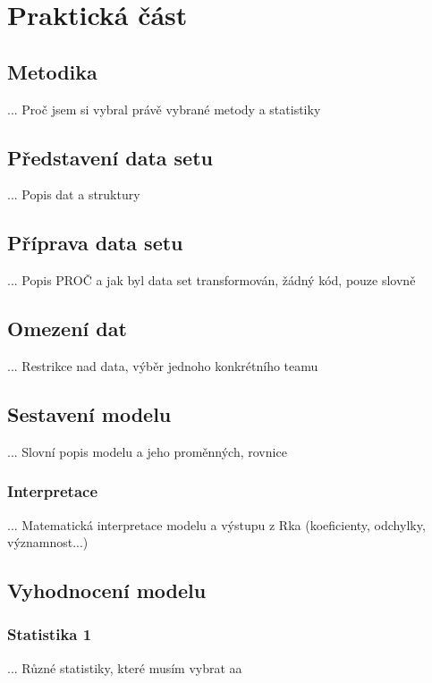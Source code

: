 \chapter{Praktická část}
\section{Metodika}
... Proč jsem si vybral právě vybrané metody a statistiky

\section{Představení data setu}
... Popis dat a struktury

\section{Příprava data setu}
... Popis PROČ a jak byl data set transformován, žádný kód, pouze slovně

\section{Omezení dat}
... Restrikce nad data, výběr jednoho konkrétního teamu

\section{Sestavení modelu}
... Slovní popis modelu a jeho proměnných, rovnice

\subsection{Interpretace}
... Matematická interpretace modelu a výstupu z Rka (koeficienty, odchylky, významnost...)

\section{Vyhodnocení modelu}
\subsection{Statistika 1}
... Různé statistiky, které musím vybrat
aa

